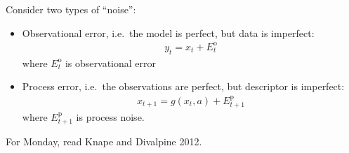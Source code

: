\documentclass{article}
\begin{document}
    Consider two types of ``noise'':
    \begin{itemize}
        \item Observational error, i.e.~the model is perfect, but data is imperfect:
        \begin{align*}
            y_t = x_t + {E_t^{\text{o}}}
        \end{align*}
        where $E_t^\text{o}$ is observational error
        \item Process error, i.e.~the observations are perfect, but descriptor is imperfect:
        \begin{align*}
            x_{t+1} = g(x_t,a) + E_{t+1}^\text{p}
        \end{align*}
        where $E_{t+1}^\text{p}$ is process noise.
    \end{itemize}

    For Monday, read Knape and Divalpine 2012.
\end{document}
